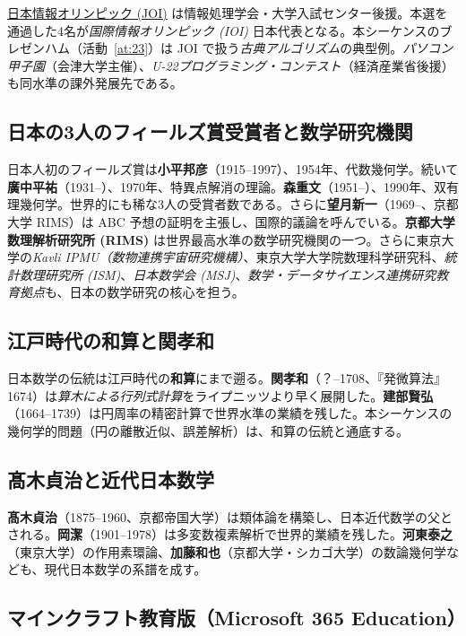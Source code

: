 \documentclass[12pt,a4paper]{scrartcl}
\newcommand{\acc}[1]{\textcolor{accent}{\textbf{#1}}}
\begin{document}
\href{https://www.ioi-jp.org/}{日本情報オリンピック (JOI)} は情報処理学会・大学入試センター後援。本選を通過した4名が\emph{国際情報オリンピック (IOI)} 日本代表となる。本シーケンスのブレゼンハム（活動~\ref{at:23}）は JOI で扱う\emph{古典アルゴリズム}の典型例。\emph{パソコン甲子園}（会津大学主催）、\emph{U-22プログラミング・コンテスト}（経済産業省後援）も同水準の課外発展先である。

\subsection{日本の3人のフィールズ賞受賞者と数学研究機関}

日本人初のフィールズ賞は\acc{小平邦彦}（1915--1997）、1954年、代数幾何学。続いて\acc{廣中平祐}（1931--）、1970年、特異点解消の理論。\acc{森重文}（1951--）、1990年、双有理幾何学。世界的にも稀な3人の受賞者数である。さらに\acc{望月新一}（1969--、京都大学 RIMS）は ABC 予想の証明を主張し、国際的議論を呼んでいる。\acc{京都大学数理解析研究所 (RIMS)} は世界最高水準の数学研究機関の一つ。さらに東京大学の\emph{Kavli IPMU（数物連携宇宙研究機構）}、東京大学大学院数理科学研究科、\emph{統計数理研究所 (ISM)}、\emph{日本数学会 (MSJ)}、\emph{数学・データサイエンス連携研究教育拠点}も、日本の数学研究の核心を担う。

\subsection{江戸時代の和算と関孝和}

日本数学の伝統は江戸時代の\acc{和算}にまで遡る。\acc{関孝和}（？--1708、『発微算法』1674）は\emph{算木による行列式計算}をライプニッツより早く展開した。\acc{建部賢弘}（1664--1739）は円周率の精密計算で世界水準の業績を残した。本シーケンスの幾何学的問題（円の離散近似、誤差解析）は、和算の伝統と通底する。

\subsection{髙木貞治と近代日本数学}

\acc{髙木貞治}（1875--1960、京都帝国大学）は類体論を構築し、日本近代数学の父とされる。\acc{岡潔}（1901--1978）は多変数複素解析で世界的業績を残した。\acc{河東泰之}（東京大学）の作用素環論、\acc{加藤和也}（京都大学・シカゴ大学）の数論幾何学なども、現代日本数学の系譜を成す。

\subsection{マインクラフト教育版（Microsoft 365 Education）}\label{sec:mee}
\end{document}
